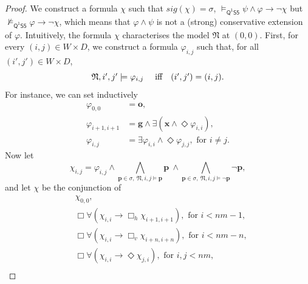 \documentclass[10pt,a4paper]{amsart}
\theoremstyle{plain}
\theoremstyle{definition}
\newcommand{\sig}{\mathit{sig}}
\newcommand{\Bht}[1]{\Box_h{#1}}
\newcommand{\Bvt}[1]{\Box_v{#1}}
\newcommand{\FOMS}{\ensuremath{\mathsf{Q^1S5}}}
\newcommand{\fform}[1]{\boldsymbol{#1}}
\newcommand{\pvar}{\fform{p}}
\newcommand{\gvar}{\fform{g}}
\newcommand{\xvar}{\fform{x}}
\newcommand{\ovar}{\fform{o}}
\newcommand{\Bv}{\forall}
\newcommand{\Bh}{\Box}
\newcommand{\Dv}{\exists}
\newcommand{\Dh}{\Diamond}
\begin{document}
\begin{proof}
	
	
	We construct a formula $\chi$ such that $\sig(\chi) =\sigma$, $\models_\FOMS \psi\land \varphi \to \neg\chi$ but 
	$\not\models_\FOMS\varphi\to \neg\chi$, which means 
	that $\varphi \wedge \psi$ is not a (strong) conservative extension of $\varphi$. Intuitively, the formula $\chi$ characterises the model $\mathfrak{N}$ at $(0,0)$. 
	First, for every $(i,j)\in W\times D$, we construct a formula $\varphi_{i,j}$ such that, for all $(i',j')\in W\times D$,
	\begin{equation}
		\label{Mdesc}
		\mbox{$\mathfrak N,i',j'\models \varphi_{i,j}$ \quad iff} \quad  
		\mbox{$(i',j')=(i,j)$}.
	\end{equation}
	For instance, we can set inductively
	\begin{align*}
		\varphi_{0,0} & =\ovar, \\
		\varphi_{i+1,i+1}  & = \gvar \wedge \Dv (\xvar \wedge \Dh \varphi_{i,i}),\\
		\varphi_{i,j} & = \mbox{$\Dv \varphi_{i,i} \wedge \Dh \varphi_{j,j},\mbox{ for $i\not=j$.} $}
	\end{align*}
	Now let
	\begin{equation}\label{diagf}
		\chi_{i,j} = \varphi_{i,j} \wedge \bigwedge_{\pvar\in\sigma,\ \mathfrak N,i,j\models \pvar}\pvar\  \land
		\bigwedge_{\pvar\in\sigma,\ \mathfrak N,i,j\models \neg\pvar}\neg\pvar,
	\end{equation}
	and let $\chi$ be the conjunction of
	\begin{align}
		\label{origf}
		&\chi_{0,0}, \\
		\label{infiRh}
		&\Bh\Bv(\chi_{i,i} \rightarrow \Bht{\chi_{i+1,i+1}}), \text{ for $i<nm-1$}, \\
		\label{infiRv}
		&\Bh\Bv(\chi_{i,i} \rightarrow \Bvt{\chi_{i+n,i+n}}), \text{ for $i<nm-n$},\\
		\label{right}
		&\Bh\Bv(\chi_{i,i} \rightarrow \Dh \chi_{j,i}), \text{ for $i,j<nm$},\\
		\label{up}

\end{align}
\end{proof}
\end{document}
